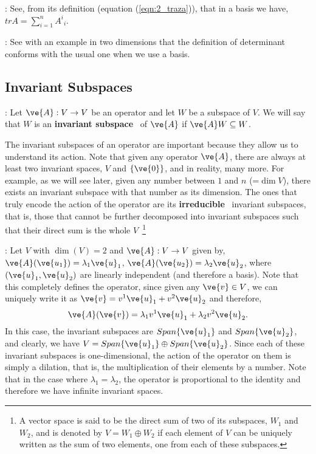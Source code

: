 \ejer: See, from its definition (equation (\ref{eqn:2_traza})), that in a basis we have,
$tr{A}= \sum_{i=1}^n A^i{}_i$.

\ejer: See with an example in two dimensions that the definition of determinant conforms with the usual one when we use a basis.


\subsection{Invariant Subspaces}
\label{Subespacios_Invariantes}

: Let $\ve{A}: V \to V$ be an operator and let $W$ be a subspace of $V$. 
We will say that $W$ is an \textbf{invariant subspace}~ 
of $\ve{A}$ if $\ve{A}W \subseteq W$.

The invariant subspaces of an operator are important because they allow us to understand its action.
Note that given any operator $\ve{A}$, there are always at least two invariant spaces, $V$ and $\{\ve{0}\}$, and in reality, many more. For example, as we will see later, given any number between $1$ and $n$ (=$\dim V$), there exists an invariant subspace with that number as its dimension. The ones that truly encode the action of the operator are its 
\textbf{irreducible}~ 
invariant subspaces, that is, those that cannot be further decomposed into invariant subspaces such that their direct sum is the whole $V$~\footnote{A vector space is said to be the direct sum of two of its subspaces, $W_1$ and $W_2$, and is denoted by $V=W_1 \oplus W_2$ if each element of $V$ can be uniquely written as the sum of two elements, one from each of these subspaces.}
\espa

\ejem: Let $V$ with $\dim(V)=2$ and $\ve{A}: V \to V$ given by, $\ve{A}(\ve{u_1}) = \lambda_1 \ve{u}_1$,
$\ve{A}(\ve{u_2}) = \lambda_2 \ve{u}_2$, where $(\ve{u}_1, \ve{u}_2)$ are linearly independent (and therefore a basis). Note that this completely defines the operator, since given any $\ve{v} \in V$, we can uniquely write it as $\ve{v} = v^1 \ve{u}_1 + v^2 \ve{u}_2$ and therefore, 
\[
\ve{A}(\ve{v}) = \lambda_1 v^1 \ve{u}_1 + \lambda_2 v^2 \ve{u}_2.
\]
In this case, the invariant subspaces are $Span\{\ve{u}_1\}$ and $Span\{\ve{u}_2\}$, and clearly, we have 
$V= Span\{\ve{u}_1\} \oplus Span\{\ve{u}_2\}$. Since each of these invariant subspaces is one-dimensional, the action of the operator on them is simply a dilation, that is, the multiplication of their elements by a number. Note that in the case where $\lambda_1=\lambda_2$, the operator is proportional to the identity and therefore we have infinite invariant spaces.

